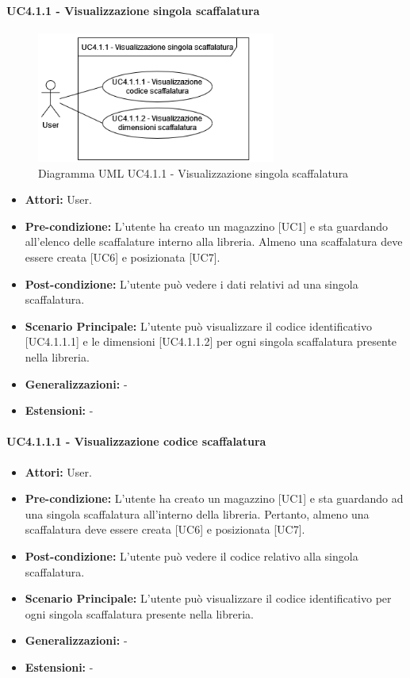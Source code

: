 \paragraph{UC4.1.1 - Visualizzazione singola scaffalatura}
\begin{figure}[H]
  \centering
  \includegraphics[width=0.7\textwidth]{UC_diagrams_1-10/UC4.1.1.drawio.png}
   \caption{Diagramma UML UC4.1.1 - Visualizzazione singola scaffalatura}
\end{figure}
\begin{itemize}
    \item \textbf{Attori:} User.
    \item \textbf{Pre-condizione:} L'utente ha creato un magazzino [UC1] e sta guardando all'elenco delle scaffalature interno alla libreria. Almeno una scaffalatura deve essere creata [UC6] e posizionata [UC7].
    \item \textbf{Post-condizione:} L'utente può vedere i dati relativi ad una singola scaffalatura.
    \item \textbf{Scenario Principale:} L'utente può visualizzare il codice identificativo [UC4.1.1.1] e le dimensioni [UC4.1.1.2] per ogni singola scaffalatura presente nella libreria.
    \item \textbf{Generalizzazioni:} -
    \item \textbf{Estensioni:} -
\end{itemize}


\paragraph{UC4.1.1.1 - Visualizzazione codice scaffalatura}
\begin{itemize}
    \item \textbf{Attori:} User.
    \item \textbf{Pre-condizione:} L'utente ha creato un magazzino [UC1] e sta guardando ad una singola scaffalatura all'interno della libreria. Pertanto, almeno una scaffalatura deve essere creata [UC6] e posizionata [UC7].
    \item \textbf{Post-condizione:} L'utente può vedere il codice relativo alla singola scaffalatura.
    \item \textbf{Scenario Principale:} L'utente può visualizzare il codice identificativo per ogni singola scaffalatura presente nella libreria.
    \item \textbf{Generalizzazioni:} -
    \item \textbf{Estensioni:} -
\end{itemize}


